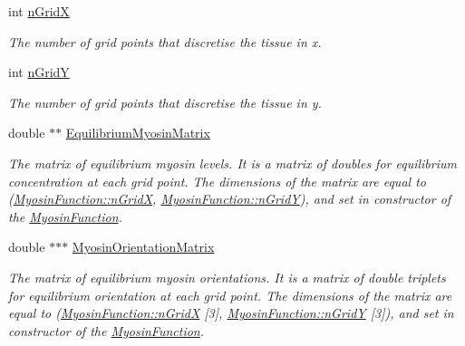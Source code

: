 \begin{DoxyCompactItemize}
\item 
\hypertarget{classMyosinFunction_a36ac0b5ce87011878a7f1954e270e5ae}{}int \hyperlink{classMyosinFunction_a36ac0b5ce87011878a7f1954e270e5ae}{n\+Grid\+X}\label{classMyosinFunction_a36ac0b5ce87011878a7f1954e270e5ae}

\begin{DoxyCompactList}\small\item\em The number of grid points that discretise the tissue in x. \end{DoxyCompactList}\item 
\hypertarget{classMyosinFunction_a1652a8a0d154b136434bee037e0262a4}{}int \hyperlink{classMyosinFunction_a1652a8a0d154b136434bee037e0262a4}{n\+Grid\+Y}\label{classMyosinFunction_a1652a8a0d154b136434bee037e0262a4}

\begin{DoxyCompactList}\small\item\em The number of grid points that discretise the tissue in y. \end{DoxyCompactList}\item 
\hypertarget{classMyosinFunction_a7332175e6d9369c02a8c569f000211e1}{}double $\ast$$\ast$ \hyperlink{classMyosinFunction_a7332175e6d9369c02a8c569f000211e1}{Equilibrium\+Myosin\+Matrix}\label{classMyosinFunction_a7332175e6d9369c02a8c569f000211e1}

\begin{DoxyCompactList}\small\item\em The matrix of equilibrium myosin levels. It is a matrix of doubles for equilibrium concentration at each grid point. The dimensions of the matrix are equal to (\hyperlink{classMyosinFunction_a36ac0b5ce87011878a7f1954e270e5ae}{Myosin\+Function\+::n\+Grid\+X}, \hyperlink{classMyosinFunction_a1652a8a0d154b136434bee037e0262a4}{Myosin\+Function\+::n\+Grid\+Y}), and set in constructor of the \hyperlink{classMyosinFunction}{Myosin\+Function}. \end{DoxyCompactList}\item 
\hypertarget{classMyosinFunction_a171909633b0117031045287fdbc401db}{}double $\ast$$\ast$$\ast$ \hyperlink{classMyosinFunction_a171909633b0117031045287fdbc401db}{Myosin\+Orientation\+Matrix}\label{classMyosinFunction_a171909633b0117031045287fdbc401db}

\begin{DoxyCompactList}\small\item\em The matrix of equilibrium myosin orientations. It is a matrix of double triplets for equilibrium orientation at each grid point. The dimensions of the matrix are equal to (\hyperlink{classMyosinFunction_a36ac0b5ce87011878a7f1954e270e5ae}{Myosin\+Function\+::n\+Grid\+X} \mbox{[}3\mbox{]}, \hyperlink{classMyosinFunction_a1652a8a0d154b136434bee037e0262a4}{Myosin\+Function\+::n\+Grid\+Y} \mbox{[}3\mbox{]}), and set in constructor of the \hyperlink{classMyosinFunction}{Myosin\+Function}. \end{DoxyCompactList}\end{DoxyCompactItemize}


